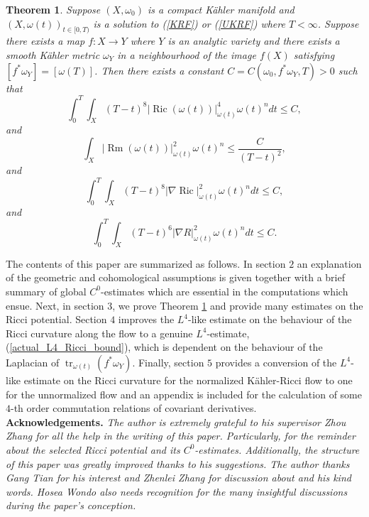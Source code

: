 \documentclass[12pt]{article}
\newtheorem{theorem}{Theorem}[section]
\numberwithin{equation}{section}
\DeclareMathOperator{\Ric}{Ric}
\DeclareMathOperator{\Rm}{Rm}
\DeclareMathOperator{\tr}{tr}
\begin{document}
\begin{theorem}\label{main_theorem}
Suppose $(X, \omega_0)$ is a compact K\"ahler manifold and $(X,\omega(t))_{t\in[0,T)}$ is a solution to (\ref{KRF}) or (\ref{UKRF}) where $T < \infty$. Suppose there exists a map $f: X \to Y$ where $Y$ is an analytic variety and there exists a smooth K\"ahler metric $\omega_Y$ in a neighbourhood of the image $f(X)$ satisfying $[f^*\omega_Y] = [\omega(T)]$. Then there exists a constant $C = C(\omega_0,f^*\omega_Y,T) > 0$ such that
\begin{equation*}
    \int_0^T \int_X (T-t)^8|\Ric(\omega(t))|^4_{\omega(t)} \omega(t)^n dt \leq C,
\end{equation*}
and
\begin{equation*}
    \int_X |\Rm(\omega(t))|^2_{\omega(t)} \omega(t)^n  \leq \frac{C}{(T-t)^2},
\end{equation*}
and
\begin{equation*}
    \int_0^T \int_X (T-t)^8 |\nabla \Ric|_{\omega(t)}^2 \omega(t)^n dt \leq C,
\end{equation*}
and
\begin{equation*}
    \int_0^T \int_X (T-t)^6 |\nabla R|_{\omega(t)}^2 \omega(t)^n dt \leq C. 
\end{equation*}
\end{theorem}

\indent The contents of this paper are summarized as follows. In section $2$ an explanation of the geometric and cohomological assumptions is given together with a brief summary of global $C^0$-estimates which are essential in the computations which ensue. Next, in section $3$, we prove Theorem \ref{main_theorem} and provide many estimates on the Ricci potential. Section $4$ improves the $L^4$-like estimate on the behaviour of the Ricci curvature along the flow to a genuine $L^4$-estimate, (\ref{actual_L4_Ricci_bound}), which is dependent on the behaviour of the Laplacian of $\tr_{\omega(t)}(f^*\omega_Y)$. Finally, section $5$ provides a conversion of the $L^4$-like estimate on the Ricci curvature for the normalized K\"ahler-Ricci flow to one for the unnormalized flow and an appendix is included for the calculation of some $4$-th order commutation relations of covariant derivatives.\\

\noindent \textbf{Acknowledgements.} \textit{The author is extremely grateful to his supervisor Zhou Zhang for all the help in the writing of this paper. Particularly, for the reminder about the selected Ricci potential and its $C^0$-estimates. Additionally, the structure of this paper was greatly improved thanks to his suggestions. The author thanks Gang Tian for his interest and Zhenlei Zhang for discussion about \cite{TZ15, TZ16} and his kind words. Hosea Wondo also needs recognition for the many insightful discussions during the paper's conception.}
\end{document}
